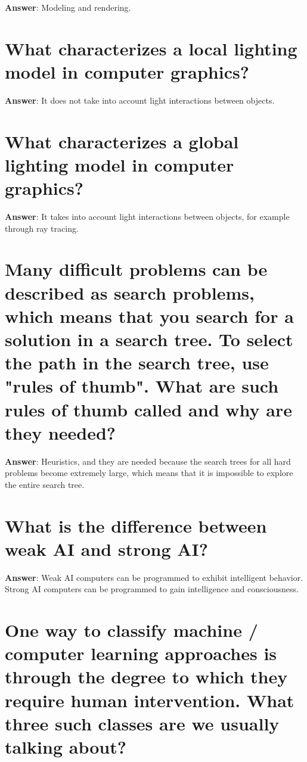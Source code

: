 \documentclass[a4paper,11pt,oneside]{book}
\begin{document}
\begin{sloppypar}
\textbf{Answer}: Modeling and rendering.



\section{What characterizes a local lighting model in computer graphics?}

\label{q:309:sa:en:True}

\textbf{Answer}: It does not take into account light interactions between objects.



\section{What characterizes a global lighting model in computer graphics?}

\label{q:310:sa:en:True}

\textbf{Answer}: It takes into account light interactions between objects, for example through ray tracing.



\section{Many difficult problems can be described as search problems, which means that you search for a solution in a search tree. To select the path in the search tree, use "rules of thumb". What are such rules of thumb called and why are they needed?}

\label{q:311:sa:en:True}

\textbf{Answer}: Heuristics, and they are needed because the search trees for all hard problems become extremely large, which means that it is impossible to explore the entire search tree.



\section{What is the difference between weak AI and strong AI?}

\label{q:312:sa:en:True}

\textbf{Answer}: Weak AI {\textendash} computers can be programmed to exhibit intelligent behavior. Strong AI {\textendash} computers can be programmed to gain intelligence and consciousness.



\section{One way to classify machine / computer learning approaches is through the degree to which they require human intervention. What three such classes are we usually talking about?}


\end{sloppypar}
\end{document}
